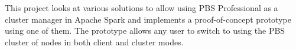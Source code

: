 
This project looks at various solutions to allow using PBS Professional as a
cluster manager in Apache Spark and implements a proof-of-concept prototype
using one of them. The prototype allows any user to switch to using the PBS
cluster of nodes in both client and cluster modes.
